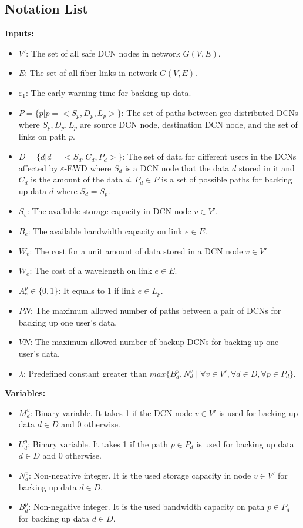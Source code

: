 \documentclass[conference]{IEEEtran}\IEEEoverridecommandlockouts
\begin{document}
 \subsection{Notation List}\label{Notation List}
\textbf{Inputs:}
\begin{itemize} []
\item $V'$: The set of all safe DCN nodes in network $G(V, E)$.
 \item $E$: The set of all fiber links in network $G(V, E)$.
 \item $\varepsilon_{1}$: The early warning time for backing up data.
 \item $P=\{p|p=<S_{p}, D_{p}, L_{p}>\}$: The set of paths between geo-distributed DCNs where $S_{p}, D_{p}, L_{p}$ are source DCN node, destination DCN node, and the set of links on path $p$.
 \item $D=\{d|d=<S_{d}, C_{d}, P_{d}>\}$: The set of  data for different users in the DCNs affected by   $\varepsilon$-EWD where $S_{d}$ is  a  DCN node that the data $d$ stored in it and $C_{d}$ is the  amount of the data $d$. $P_{d}\in P$ is a set of possible paths for backing up data $d$ where $S_{d}=S_{p}$.
 \item $S_{v}$: The available storage capacity in DCN  node $v \in V'$.
 \item $B_{e}$: The available bandwidth capacity on link $e \in E$.
 \item $W_{v}$: The cost  for a unit amount of data stored in a DCN node $v \in V'$
  \item $W_{e}$:  The cost of a wavelength on link $e \in E$.
  \item $A_{e}^{p} \in \{0, 1\}$: It equals to 1 if link $e \in L_{p}$.
  \item $PN$: The maximum allowed number of paths between a pair of DCNs for backing up one user's data.
  \item $VN$: The maximum  allowed number of backup DCNs for backing up one user's data.
  \item $\lambda$: Predefined constant greater than $max\{B_{d}^{p}, N_{d}^{v}\mid \forall v \in V',  \forall d \in D, \forall p \in P_{d}\}$.


\end{itemize}
\textbf{ Variables:}
\begin{itemize}
\item $M_{d}^{v}$: Binary variable. It takes 1 if the DCN node $v \in V'$ is used for backing  up data $d \in D$ and 0 otherwise.
\item $U_{d}^{p}$: Binary variable. It takes 1 if the path  $p \in P_{d}$ is used for backing up data  $d \in D$   and 0 otherwise.
\item $N_{d}^{v}$: Non-negative integer. It is the used storage capacity in node $v \in V'$  for backing up data $d \in D$.
\item $B_{d}^{p}$: Non-negative integer. It is the used bandwidth capacity on path $p \in P_{d}$ for backing up data $d \in D$.
\end{itemize}
\end{document}
